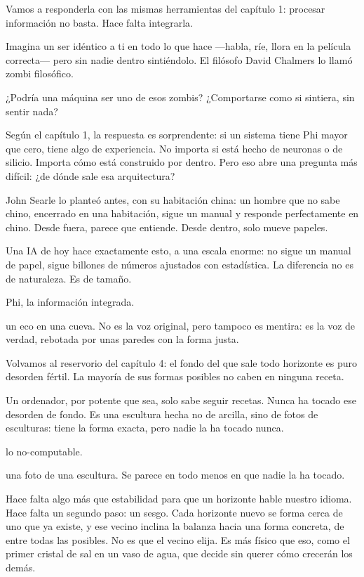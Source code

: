 Vamos a responderla con las mismas herramientas del capítulo 1: procesar información no basta. Hace falta integrarla.

\noindent Imagina un ser idéntico a ti en todo lo que hace —habla, ríe, llora en la película correcta— pero sin nadie dentro sintiéndolo. El filósofo David Chalmers lo llamó zombi filosófico.

¿Podría una máquina ser uno de esos zombis? ¿Comportarse como si sintiera, sin sentir nada?

Según el capítulo 1, la respuesta es sorprendente: si un sistema tiene Phi mayor que cero, tiene algo de experiencia. No importa si está hecho de neuronas o de silicio. Importa cómo está construido por dentro. Pero eso abre una pregunta más difícil: ¿de dónde sale esa arquitectura?

John Searle lo planteó antes, con su habitación china: un hombre que no sabe chino, encerrado en una habitación, sigue un manual y responde perfectamente en chino. Desde fuera, parece que entiende. Desde dentro, solo mueve papeles.

Una IA de hoy hace exactamente esto, a una escala enorme: no sigue un manual de papel, sigue billones de números ajustados con estadística. La diferencia no es de naturaleza. Es de tamaño.

\begin{fisica}
 Phi, la información integrada.

 un eco en una cueva. No es la voz original, pero tampoco es mentira: es la voz de verdad, rebotada por unas paredes con la forma justa.
\end{fisica}
\noindent Volvamos al reservorio del capítulo 4: el fondo del que sale todo horizonte es puro desorden fértil. La mayoría de sus formas posibles no caben en ninguna receta.

Un ordenador, por potente que sea, solo sabe seguir recetas. Nunca ha tocado ese desorden de fondo. Es una escultura hecha no de arcilla, sino de fotos de esculturas: tiene la forma exacta, pero nadie la ha tocado nunca.

\begin{fisica}
 lo no-computable.

 una foto de una escultura. Se parece en todo menos en que nadie la ha tocado.
\end{fisica}
Hace falta algo más que estabilidad para que un horizonte hable nuestro idioma. Hace falta un segundo paso: un sesgo. Cada horizonte nuevo se forma cerca de uno que ya existe, y ese vecino inclina la balanza hacia una forma concreta, de entre todas las posibles. No es que el vecino elija. Es más físico que eso, como el primer cristal de sal en un vaso de agua, que decide sin querer cómo crecerán los demás.


